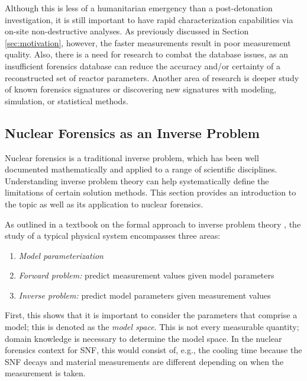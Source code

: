 Although this is less of a humanitarian emergency than a post-detonation
investigation, it is still important to have rapid characterization
capabilities via on-site non-destructive analyses.  As previously discussed in
Section \ref{sec:motivation}, however, the faster measurements result in poor
measurement quality. Also, there is a need for research to combat the database
issues, as an insufficient forensics database can reduce the accuracy and/or
certainty of a reconstructed set of reactor parameters.  Another area of
research is deeper study of known forensics signatures or discovering new
signatures with modeling, simulation, or statistical methods. 

\subsection{Nuclear Forensics as an Inverse Problem}
\label{sec:inverse}

Nuclear forensics is a traditional inverse problem, which has been well
documented mathematically and applied to a range of scientific disciplines.
Understanding inverse problem theory can help systematically define the
limitations of certain solution methods.  This section provides an introduction
to the topic as well as its application to nuclear forensics. 

As outlined in a textbook on the formal approach to inverse problem theory
\cite{inverse_theory}, the study of a typical physical system encompasses three
areas:
\begin{enumerate}
  \itemsep-0.75em
  \item \textit{Model parameterization}
  \item \textit{Forward problem:} predict measurement values given model parameters
  \item \textit{Inverse problem:} predict model parameters given measurement values
\end{enumerate}

First, this shows that it is important to consider the parameters that comprise
a model; this is denoted as the \textit{model space}. This is not every
measurable quantity; domain knowledge is necessary to determine the model
space. In the nuclear forensics context for \gls{SNF}, this would consist of,
e.g., the cooling time because the \gls{SNF} decays and material measurements
are different depending on when the measurement is taken.

